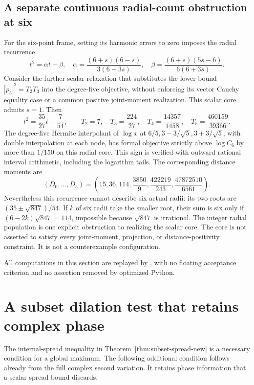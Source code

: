 \documentclass[11pt]{article}
\theoremstyle{remark}
\numberwithin{equation}{section}
\begin{document}
\subsection{A separate continuous radial-count obstruction at six}
For the six-point frame, setting its harmonic errors to zero
imposes the radial recurrence
\[
 t^2=\alpha t+\beta,\quad
 \alpha=\frac{(6+s)(6-s)}{3(6+3s)},\quad
 \beta=\frac{(6+s)(5s-6)}{6(6+3s)}.
\]
Consider the further scalar relaxation that substitutes the lower
bound $|p_5|^2= T_2T_3$ into the degree-five objective, without
enforcing its vector Cauchy equality case or a common positive
joint-moment realization. This scalar core admits $s=1$. Then
\[
 t^2=\frac{35}{27}t-\frac7{54},\qquad
 T_2=7,\quad T_3=\frac{224}{27},\quad
 T_4=\frac{14357}{1458},\quad T_5=\frac{460159}{39366}.
\]
The degree-five Hermite interpolant of $\log x$ at
$6/5,3-3/\sqrt5,3+3/\sqrt5$, with double interpolation at each
node, has formal objective strictly above $\log C_6$ by more than
$1/150$ on this radial core. This sign is verified with outward
rational interval arithmetic, including the logarithm tails.
The corresponding distance moments are
\[
 (D_0,\ldots,D_5)
 =\left(15,36,114,\frac{3850}{9},
               \frac{422219}{243},\frac{47872510}{6561}\right).
\]
Nevertheless this recurrence cannot describe six actual radii:
its two roots are $(35\pm\sqrt{847})/54$. If $k$ of six radii
take the smaller root, their sum is six only if
$(6-2k)\sqrt{847}=114$, impossible because $\sqrt{847}$ is irrational.
The integer radial population is one explicit obstruction to
realizing the scalar core. The core is not asserted to satisfy every
joint-moment, projection, or distance-positivity constraint.
It is not a counterexample configuration.

All computations in this section are replayed by
, with no floating acceptance
criterion and no assertion removed by optimized Python.

\section{A subset dilation test that retains complex phase}
\label{sec:noclass-subset-dilation}
The internal-spread inequality in Theorem~\ref{thm:subset-spread-new}
is a necessary condition for a global maximum. The following additional
condition follows already from the full complex second variation. It
retains phase information that a scalar spread bound discards.
\end{document}
